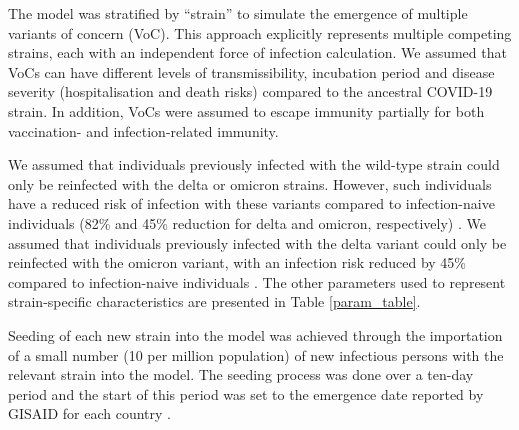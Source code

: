 
The model was stratified by ``strain'' to simulate the emergence of multiple variants of concern (VoC).
This approach explicitly represents multiple competing strains, each with an independent force of infection calculation.
We assumed that VoCs can have different levels of transmissibility, incubation period and disease severity 
(hospitalisation and death risks) compared to the ancestral COVID-19 strain. In addition, VoCs were assumed to escape 
immunity partially for both vaccination- and infection-related immunity. 

We assumed that individuals previously infected with the wild-type strain could only be reinfected with the delta or 
omicron strains. However, such individuals have a reduced risk of infection with these variants compared to 
infection-naive individuals (82\% and 45\% reduction for delta and omicron, respectively) \cite{stein2023}.
We assumed that individuals previously infected with the delta variant could only be reinfected with the omicron variant, 
with an infection risk reduced by 45\% compared to infection-naive individuals \cite{stein2023}. 
The other parameters used to represent strain-specific characteristics are presented in Table \ref{param_table}.

Seeding of each new strain into the model was achieved through the importation of a small number (10 per million population) of new infectious persons with the relevant strain into the model.
The seeding process was done over a ten-day period and the start of this period was set to the emergence date reported by GISAID for each country \cite{gisaid2023}.
